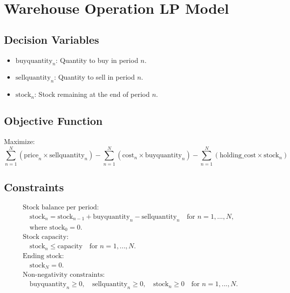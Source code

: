 \documentclass{article}
\begin{document}
\section*{Warehouse Operation LP Model}

\subsection*{Decision Variables}
\begin{itemize}
    \item $\text{buyquantity}_n$: Quantity to buy in period \( n \).
    \item $\text{sellquantity}_n$: Quantity to sell in period \( n \).
    \item $\text{stock}_n$: Stock remaining at the end of period \( n \).
\end{itemize}

\subsection*{Objective Function}
Maximize:
\[
\sum_{n=1}^{N} \left( \text{price}_n \times \text{sellquantity}_n \right) - \sum_{n=1}^{N} \left( \text{cost}_n \times \text{buyquantity}_n \right) - \sum_{n=1}^{N} \left( \text{holding\_cost} \times \text{stock}_n \right)
\]

\subsection*{Constraints}
\begin{align*}
& \text{Stock balance per period:} \\
& \quad \text{stock}_n = \text{stock}_{n-1} + \text{buyquantity}_n - \text{sellquantity}_n \quad \text{for } n=1,...,N, \\
& \quad \text{where } \text{stock}_0 = 0. \\

& \text{Stock capacity:} \\
& \quad \text{stock}_n \leq \text{capacity} \quad \text{for } n=1,...,N. \\

& \text{Ending stock:} \\
& \quad \text{stock}_N = 0. \\

& \text{Non-negativity constraints:} \\
& \quad \text{buyquantity}_n \geq 0, \quad \text{sellquantity}_n \geq 0, \quad \text{stock}_n \geq 0 \quad \text{for } n=1,...,N.
\end{align*}
\end{document}
